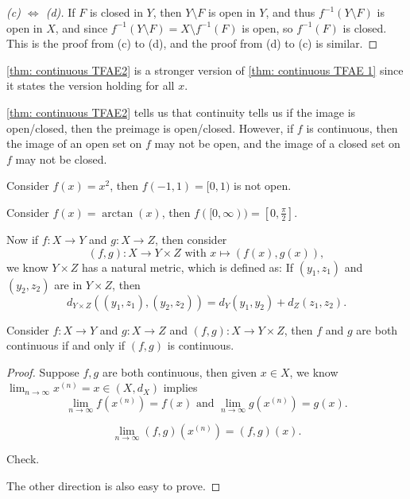 \begin{proof}[(c) \(\iff \) (d)]
    If \(F\) is closed in \(Y\), then \(Y \setminus F\) is open in \(Y\), and thus \(f^{-1}(Y \setminus F) \) is open in \(X\), and since \(f^{-1} (Y \setminus F) = X \setminus f^{-1}(F) \) is open, so \(f^{-1}(F) \) is closed. This is the proof from (c) to (d), and the proof from (d) to (c) is similar.      
\end{proof}

\begin{note}
    \autoref{thm: continuous TFAE2} is a stronger version of \autoref{thm: continuous TFAE 1} since it states the version holding for all \(x\).   
\end{note}

\begin{remark}
    \autoref{thm: continuous TFAE2} tells us that continuity tells us if the image is open/closed, then the preimage is open/closed. However, if \(f\) is continuous, then the image of an open set on \(f\) may not be open, and the image of a closed set on \(f\) may not be closed.     
\end{remark}

\begin{eg}
    Consider \(f(x) = x^2\), then \(f(-1, 1) = [0, 1)\) is not open.   
\end{eg}

\begin{eg}
    Consider \(f(x) = \arctan (x)\), then \(f([0, \infty )) = [0, \frac{\pi}{2}]\).  
\end{eg}

Now if \(f: X \to Y\) and \(g: X \to Z\), then consider
\[
    (f, g) : X \to Y \times Z \text{ with } x \mapsto (f(x), g(x)),
\] we know \(Y \times Z\) has a natural metric, which is defined as: If \((y_1, z_1) \) and \((y_2, z_2)\) are in \(Y \times Z\), then 
\[
    d_{Y \times Z}\left( (y_1, z_1), (y_2, z_2) \right) = d_Y(y_1, y_2) + d_Z(z_1, z_2). 
\]    

\begin{lemma}
    Consider \(f: X \to Y\) and \(g: X \to Z\) and \((f, g): X \to Y \times Z\), then \(f\) and \(g\) are both continuous if and only if \((f, g)\) is continuous.       
\end{lemma}
\begin{proof}
    Suppose \(f, g\) are both continuous, then given \(x \in X\), we know \(\lim_{n \to \infty} x^{(n)} = x \in (X, d_X) \) implies 
    \[
        \lim_{n \to \infty} f \left( x^{(n)} \right) = f(x) \text{ and } \lim_{n \to \infty} g \left( x^{(n)} \right) = g(x).    
    \] 
    \begin{claim}
        \[
            \lim_{n \to \infty} (f, g) \left( x^{(n)} \right) = (f, g)(x). 
        \]
    \end{claim}
    \begin{explanation}
        Check.
    \end{explanation}
    The other direction is also easy to prove.
\end{proof}